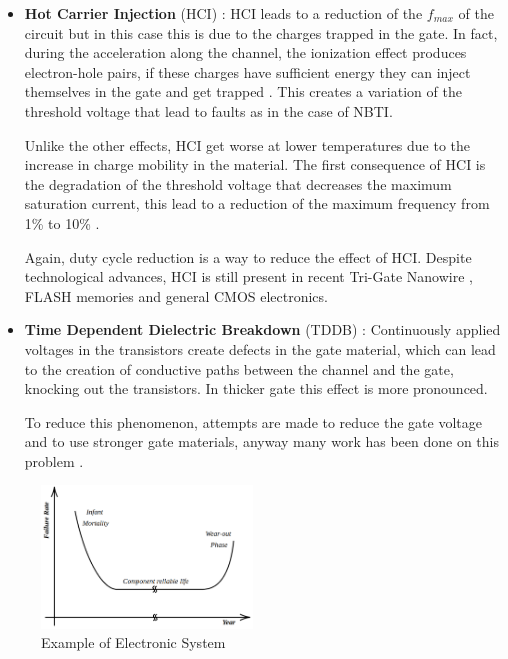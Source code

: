{{{\begin{itemize}
				\item \textbf{Hot Carrier Injection} (HCI) : HCI leads to a reduction of the $f_{max}$ of the circuit but in this case  this is due to the charges trapped in the gate. In fact, during the acceleration along the channel, the ionization effect produces electron-hole pairs, if these charges have sufficient energy they can inject themselves in the gate and get trapped . This creates a variation of the threshold voltage that lead to faults as in the case of NBTI.
				
				Unlike the other effects, HCI get worse at lower temperatures due to the increase in charge mobility in the material. The first consequence of HCI is the degradation of the threshold voltage that decreases the maximum saturation current, this lead to a reduction of the maximum frequency from 1\% to 10\% .
				
				Again, duty cycle reduction is a way to reduce the effect of HCI. Despite technological advances, HCI is still present in recent Tri-Gate Nanowire , FLASH memories  and general CMOS electronics.
				
				\item \textbf{Time Dependent Dielectric Breakdown} (TDDB) : Continuously applied voltages in the transistors create defects in the gate material, which can lead to the creation of conductive paths between the channel and the gate, knocking out the transistors. In thicker gate this effect is more pronounced.
				
				To reduce this phenomenon, attempts are made to reduce the gate voltage and to use stronger gate materials, anyway many work has been done on this problem  .
				
			\end{itemize}
			
			
			\begin{figure}
				\includegraphics[width=0.5\textwidth]{./images/ComponentLife.png}
				\caption{Example of Electronic System}
				\label{fig:ComponentLife}
			\end{figure} 
		
}}}

